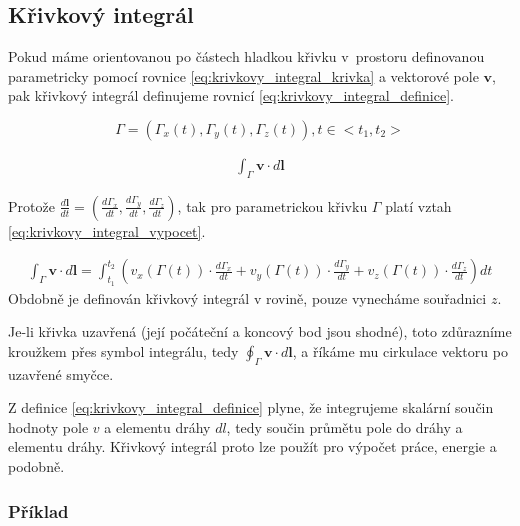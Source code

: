 \documentclass{book}
\newcommand{\vect}[1]{\boldsymbol{#1}}
\begin{document}
\subsection{Křivkový integrál}

Pokud máme orientovanou po částech hladkou křivku v~prostoru definovanou parametricky pomocí rovnice \eqref{eq:krivkovy_integral_krivka} a vektorové pole \(\vect{v}\), pak křivkový integrál definujeme rovnicí \eqref{eq:krivkovy_integral_definice}.

\begin{equation}
\label{eq:krivkovy_integral_krivka}
\Gamma = (\Gamma_x(t), \Gamma_y(t), \Gamma_z(t)), t \in <t_1, t_2>
\end{equation}

\begin{equation}
\label{eq:krivkovy_integral_definice}
\begin{split}
\int_\Gamma \vect{v} \cdot d\vect{l}
\end{split}
\end{equation}

Protože \(\frac{d\vect{l}}{dt} = \left(\frac{d \Gamma_x}{dt}, \frac{d \Gamma_y}{dt}, \frac{d \Gamma_z}{dt} \right)\), tak pro parametrickou křivku
\(\Gamma\) platí vztah \eqref{eq:krivkovy_integral_vypocet}.

\begin{equation}
\label{eq:krivkovy_integral_vypocet}
\begin{split}
\int_\Gamma \vect{v} \cdot d\vect{l} =
\int_{t_1}^{t_2} \left(v_x(\Gamma(t)) \cdot \frac{d \Gamma_x}{dt} + v_y(\Gamma(t)) \cdot \frac{d \Gamma_y}{dt} + v_z(\Gamma(t)) \cdot \frac{d \Gamma_z}{dt} \right) dt
\end{split}
\end{equation}
Obdobně je definován křivkový integrál v rovině, pouze vynecháme souřadnici \(z\).

Je-li křivka uzavřená (její počáteční a koncový bod jsou shodné), toto zdůrazníme kroužkem přes symbol integrálu, tedy \(\oint_\Gamma \vect{v} \cdot d\vect{l}\), a říkáme mu cirkulace vektoru po uzavřené smyčce.

Z definice \eqref{eq:krivkovy_integral_definice} plyne, že integrujeme skalární součin hodnoty pole \(v\) a elementu dráhy \(dl\),
tedy součin průmětu pole do dráhy a elementu dráhy. Křivkový integrál proto lze použít pro výpočet práce, energie a podobně.


\subsubsection{Příklad}
\end{document}
